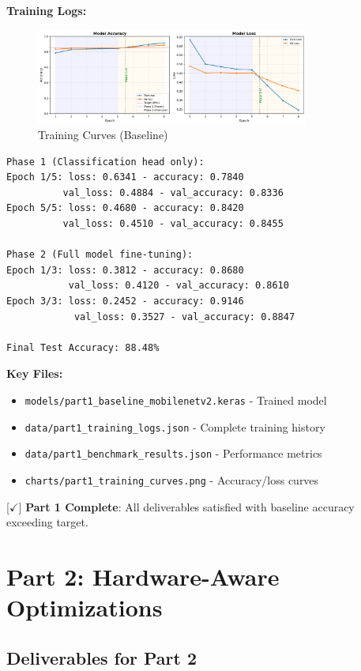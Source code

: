\documentclass[10pt, a4paper]{article}
\begin{document}
\textbf{Training Logs:}
\begin{figure}[H]
\centering
\includegraphics[width=0.8\textwidth]{charts/part1_training_curves.png}
\caption{Training Curves (Baseline)}
\end{figure}

\begin{verbatim}
Phase 1 (Classification head only):
Epoch 1/5: loss: 0.6341 - accuracy: 0.7840
          val_loss: 0.4884 - val_accuracy: 0.8336
Epoch 5/5: loss: 0.4680 - accuracy: 0.8420
          val_loss: 0.4510 - val_accuracy: 0.8455

Phase 2 (Full model fine-tuning):
Epoch 1/3: loss: 0.3812 - accuracy: 0.8680
           val_loss: 0.4120 - val_accuracy: 0.8610
Epoch 3/3: loss: 0.2452 - accuracy: 0.9146
            val_loss: 0.3527 - val_accuracy: 0.8847

Final Test Accuracy: 88.48%
\end{verbatim}

\textbf{Key Files:}
\begin{itemize}
    \item \texttt{models/part1\_baseline\_mobilenetv2.keras} - Trained model
    \item \texttt{data/part1\_training\_logs.json} - Complete training history
    \item \texttt{data/part1\_benchmark\_results.json} - Performance metrics
    \item \texttt{charts/part1\_training\_curves.png} - Accuracy/loss curves
\end{itemize}

[$\checkmark$] \textbf{Part 1 Complete}: All deliverables satisfied with baseline accuracy exceeding target.

\section*{Part 2: Hardware-Aware Optimizations}

\subsection{Deliverables for Part 2}
\end{document}
